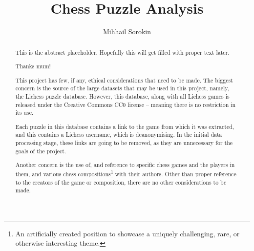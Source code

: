 \documentclass[a4paper, twoside]{report}
\title{Chess Puzzle Analysis}
\author{Mihhail Sorokin}
\begin{document}



\begin{abstract}

    This is the abstract placeholder. Hopefully this will get filled with
    proper text later.

\end{abstract}

\renewcommand{\abstractname}{Acknowledgements}
\begin{abstract}

    Thanks mum!

\end{abstract}

\renewcommand{\abstractname}{Ethical Discussion}
\begin{abstract}

    This project has few, if any, ethical considerations that need to be made.
    The biggest concern is the source of the large datasets that may be used in
    this project, namely, the Lichess puzzle database. However, this database,
    along with all Lichess games is released under the Creative Commons CC0
    license -- meaning there is no restriction in its use.

    Each puzzle in this database contains a link to the game from which it was
    extracted, and this contains a Lichess username, which is deanonymising. In
    the initial data processing stage, these links are going to be removed, as
    they are unnecessary for the goals of the project.

    Another concern is the use of, and reference to specific chess games and
    the players in them, and various chess compositions\footnote{An
    artificially created position to showcase a uniquely challenging, rare, or
    otherwise interesting theme.} with their authors. Other than proper
    reference to the creators of the game or composition, there are no other
    considerations to be made.

\end{abstract}

\tableofcontents




%

%



\end{document}
